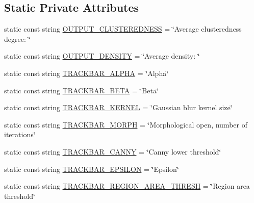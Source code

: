 \subsection*{Static Private Attributes}
\begin{DoxyCompactItemize}
\item 
static const string \hyperlink{classmultiscale_1_1analysis_1_1RegionDetector_a7eeefa86e8c94ee7c89b3e17fb94d931}{O\-U\-T\-P\-U\-T\-\_\-\-C\-L\-U\-S\-T\-E\-R\-E\-D\-N\-E\-S\-S} = \char`\"{}Average clusteredness degree\-: \char`\"{}
\item 
static const string \hyperlink{classmultiscale_1_1analysis_1_1RegionDetector_ad432faee394557fc48ff6baaceddf1cb}{O\-U\-T\-P\-U\-T\-\_\-\-D\-E\-N\-S\-I\-T\-Y} = \char`\"{}Average density\-: \char`\"{}
\item 
static const string \hyperlink{classmultiscale_1_1analysis_1_1RegionDetector_a5513e029d4d4cf249aa40364489f7a85}{T\-R\-A\-C\-K\-B\-A\-R\-\_\-\-A\-L\-P\-H\-A} = \char`\"{}Alpha\char`\"{}
\item 
static const string \hyperlink{classmultiscale_1_1analysis_1_1RegionDetector_a79d7878ed55bf12a87637896a1f44e37}{T\-R\-A\-C\-K\-B\-A\-R\-\_\-\-B\-E\-T\-A} = \char`\"{}Beta\char`\"{}
\item 
static const string \hyperlink{classmultiscale_1_1analysis_1_1RegionDetector_a79b72da59c92b368fb7894fe1f424e00}{T\-R\-A\-C\-K\-B\-A\-R\-\_\-\-K\-E\-R\-N\-E\-L} = \char`\"{}Gaussian blur kernel size\char`\"{}
\item 
static const string \hyperlink{classmultiscale_1_1analysis_1_1RegionDetector_a0358affd40f13327b10447b7fe938338}{T\-R\-A\-C\-K\-B\-A\-R\-\_\-\-M\-O\-R\-P\-H} = \char`\"{}Morphological open, number of iterations\char`\"{}
\item 
static const string \hyperlink{classmultiscale_1_1analysis_1_1RegionDetector_a8c1c5cde2b7d42ddce44b7f8208f07cc}{T\-R\-A\-C\-K\-B\-A\-R\-\_\-\-C\-A\-N\-N\-Y} = \char`\"{}Canny lower threshold\char`\"{}
\item 
static const string \hyperlink{classmultiscale_1_1analysis_1_1RegionDetector_aa3f0755a58457592ac027b42576bd312}{T\-R\-A\-C\-K\-B\-A\-R\-\_\-\-E\-P\-S\-I\-L\-O\-N} = \char`\"{}Epsilon\char`\"{}
\item 
static const string \hyperlink{classmultiscale_1_1analysis_1_1RegionDetector_a6a2711f5cabb3af04a969fe38e1ef473}{T\-R\-A\-C\-K\-B\-A\-R\-\_\-\-R\-E\-G\-I\-O\-N\-\_\-\-A\-R\-E\-A\-\_\-\-T\-H\-R\-E\-S\-H} = \char`\"{}Region area threshold\char`\"{}
\item 

\end{DoxyCompactItemize}
